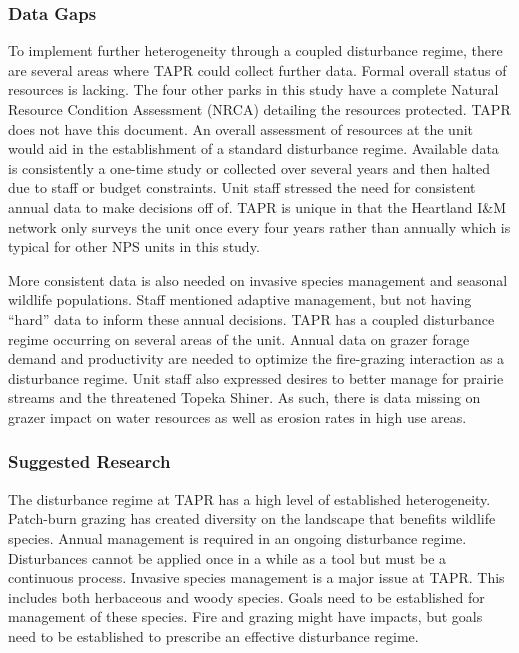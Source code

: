 \subsubsection{Data Gaps}

To implement further heterogeneity through a coupled disturbance regime, there are several areas where TAPR could collect further data. 
Formal overall status of resources is lacking. 
The four other parks in this study have a complete Natural Resource Condition Assessment (NRCA) detailing the resources protected. 
TAPR does not have this document. 
An overall assessment of resources at the unit would aid in the establishment of a standard disturbance regime. 
Available data is consistently a one-time study or collected over several years and then halted due to staff or budget constraints. 
Unit staff stressed the need for consistent annual data to make decisions off of. 
TAPR is unique in that the Heartland I\&M network only surveys the unit once every four
years rather than annually which is typical for other NPS units in this study.

More consistent data is also needed on invasive species management and seasonal wildlife populations. 
Staff mentioned adaptive management, but not having ``hard'' data to inform these annual decisions. 
TAPR has a coupled disturbance regime occurring on several areas of the unit.
Annual data on grazer forage demand and productivity are needed to optimize the fire-grazing interaction as a disturbance regime. 
Unit staff also expressed desires to better manage for prairie streams and the threatened Topeka Shiner. 
As such, there is data missing on grazer impact on water resources as well as erosion rates in high use areas.

\subsubsection{Suggested Research}

The disturbance regime at TAPR has a high level of established heterogeneity. 
Patch-burn grazing has created diversity on the landscape that benefits wildlife species. 
Annual management is required in an ongoing disturbance regime. 
Disturbances cannot be applied once in a while as a tool but must be a continuous process. 
Invasive species management is a major issue at TAPR. 
This includes both herbaceous and woody species. 
Goals need to be established for management of these species. 
Fire and grazing might have impacts, but goals need to be established to prescribe an effective disturbance regime.

